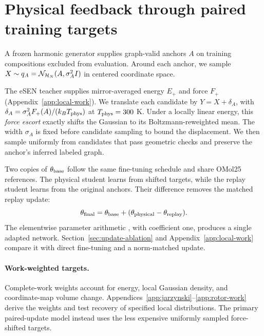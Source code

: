 \section{Physical feedback through paired training targets}\label{app:paired-training}
A frozen harmonic generator supplies graph-valid anchors $A$ on training compositions excluded from evaluation. Around each anchor, we sample $X\sim q_A=\mathcal N_{\mathcal H_N}(A,\sigma_A^2I)$ in centered coordinate space.

The eSEN teacher supplies mirror-averaged energy $E_+$ and force $F_+$ (Appendix~\ref{app:local-work}). We translate each candidate by $Y=X+\delta_A$, with $\delta_A=\sigma_A^2F_+(A)/(k_B T_{\rm phys})$ at $T_{\rm phys}=300$ K. Under a locally linear energy, this \emph{force escort} exactly shifts the Gaussian to its Boltzmann-reweighted mean. The width $\sigma_A$ is fixed before candidate sampling to bound the displacement. We then sample uniformly from candidates that pass geometric checks and preserve the anchor's inferred labeled graph.

Two copies of $\theta_{\rm base}$ follow the same fine-tuning schedule and share OMol25 references. The physical student learns from shifted targets, while the replay student learns from the original anchors. Their difference removes the matched replay update:
\begin{equation}
 \theta_{\rm final} = \theta_{\rm base} + (\theta_{\rm physical}-\theta_{\rm replay}).
 \label{eq:physical-transfer}
\end{equation}
The elementwise parameter arithmetic \citep{ilharco2023arithmetic}, with coefficient one, produces a single adapted network. Section~\ref{sec:update-ablation} and Appendix~\ref{app:local-work} compare it with direct fine-tuning and a norm-matched update.

\paragraph{Work-weighted targets.}
Complete-work weights account for energy, local Gaussian density, and coordinate-map volume change. Appendices~\ref{app:jarzynski}--\ref{app:rotor-work} derive the weights and test recovery of specified local distributions. The primary paired-update model instead uses the less expensive uniformly sampled force-shifted targets.

